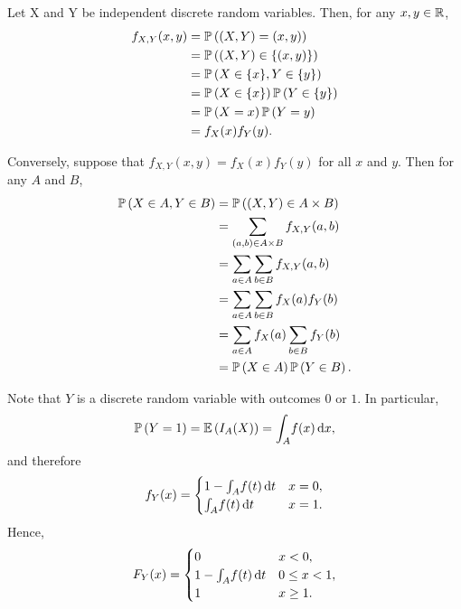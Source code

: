 \begin{ex}
  Let X and Y be independent discrete random variables. Then, for any
  $x,y\in\R$,
  \begin{align*}
    f_{X,Y}(x,y)
     & =\P{(X, Y)=(x, y)}            \\
     & =\P{(X, Y)\in \{(x, y)\}}     \\
     & =\P{X\in \{x\}, Y\in \{y\}}   \\
     & =\P{X\in \{x\}}\P{Y\in \{y\}} \\
     & =\P{X=x}\P{Y=y}               \\
     & =f_X(x)f_Y(y).
  \end{align*}

  Conversely, suppose that $f_{X,Y}(x,y)=f_X(x)f_Y(y)$ for all $x$ and $y$.
  Then for any $A$ and $B$,
  \begin{align*}
    \P{X\in A, Y\in B}
     & =\P{(X, Y)\in A\times B}                          \\
     & =\sum_{\substack{(a,b)\in A\times B}}f_{X,Y}(a,b) \\
     & =\sum_{a\in A}\sum_{b\in B}f_{X,Y}(a,b)           \\
     & =\sum_{a\in A}\sum_{b\in B}f_{X}(a)f_{Y}(b)       \\
     & =\sum_{a\in A}f_X(a)\sum_{b\in B}f_{Y}(b)         \\
     & =\P{X\in A}\P{Y\in B}.
  \end{align*}
\end{ex}

\begin{ex}
  Note that $Y$ is a discrete random variable with outcomes $0$ or $1$. In
  particular,
  \[
    \P{Y=1}=\E{I_A(X)}=\int_A\! f(x)\,\d{x},
  \]
  and therefore
  \[
    f_Y(x)=\begin{cases}
      1-\int_A\! f(t)\,\d{t} & x=0, \\
      \int_A\! f(t)\,\d{t}   & x=1.
    \end{cases}
  \]
  Hence,
  \[
    F_Y(x)=\begin{cases}
      0                      & x < 0,       \\
      1-\int_A\! f(t)\,\d{t} & 0\leq x < 1, \\
      1                      & x\geq 1.
    \end{cases}
  \]
\end{ex}

